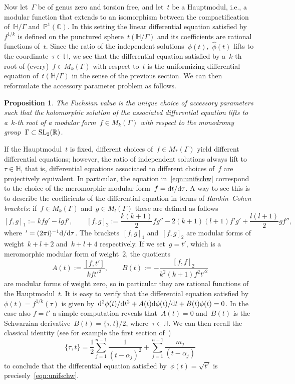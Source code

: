 \documentclass[pdftex]{sigma}
\newcommand{\C}{\mathbb{C}}
\newcommand{\R}{\mathbb{R}}
\newcommand{\pro}{\mathbb{P}}
\newcommand{\Po}{\mathbb{H}}
\numberwithin{equation}{section}
\newtheorem{Proposition}[Theorem]{Proposition}
 { \theoremstyle{definition}
\newtheorem{Definition}[Theorem]{Definition}
\newtheorem{Example}[Theorem]{Example}
\newtheorem{Remark}[Theorem]{Remark} }
\begin{document}
Now let~$\Gamma$ be of genus zero and torsion free, and let~$t$ be a Hauptmodul, i.e., a modular function that extends to an isomorphism between the compactification of~$\Po/\Gamma$ and~$\pro^1(\C)$. In this setting the linear differential equation satisfied by~$f^{1/k}$ is defined on the punctured sphere~$t(\Po/\Gamma)$ and its coefficients are rational functions of~$t$. Since the ratio of the independent solutions~$\phi(t)$,~$\hat{\phi}(t)$ lifts to the coordinate~$\tau\in\Po$, we see that the differential equation satisfied by a~$k$-th root of (every)~$f\in M_k(\Gamma)$ with respect to~$t$ is the uniformizing differential equation of~$t(\Po/\Gamma)$ in the sense of the previous section. We can then reformulate the accessory parameter problem as follows.
\begin{Proposition}\label{thm:refor}
The Fuchsian value is the unique choice of accessory parameters such that the holomorphic solution of the associated differential equation lifts to a~$k$-th root of a modular form~$f\in M_k(\Gamma)$ with respect to the monodromy group~$\Gamma\subset{\rm SL}_2(\R)$.
\end{Proposition}

If the Hauptmodul~$t$ is fixed, different choices of~$f\in M_*(\Gamma)$ yield different differential equations; however, the ratio of independent solutions always lift to~$\tau\in\Po$, that is, differential equations associated to different choices of~$f$ are projectively equivalent. In particular, the equation in~\eqref{eqn:unifschw} correspond to the choice of the meromorphic modular form~$f={\rm d}t/{\rm d}\tau$. A way to see this is to describe the coefficients of the differential equation in terms of \emph{Rankin--Cohen brackets}: if~$f\in M_k(\Gamma)$ and~$g\in M_l(\Gamma)$ these are defined as follows
\[
[f,g]_1:=kfg'-lgf' ,\qquad [f,g]_2:=\frac{k(k+1)}{2}fg''-2(k+1)(l+1)f'g'+\frac{l(l+1)}{2}gf'',
\]
where~$'=(2\pi {\rm i})^{-1}{\rm d}/{\rm d}\tau$. The brackets~$[f,g]_1$ and~$[f,g]_2$ are modular forms of weight~$k+l+2$ and~$k+l+4$ respectively. If we set~$g=t'$, which is a meromorphic modular form of weight~$2$, the quotients
\[
A(t) :=\frac{[f,t']}{kft'^2},\qquad B(t) :=-\frac{[f,f]_2}{k^2(k+1)f^2t'^2}
\]
are modular forms of weight zero, so in particular they are rational functions of the Hauptmodul~$t$. It is easy to verify that the differential equation satisfied by~$\phi(t)=f^{1/k}(\tau)$ is given by~${\rm d}^2\phi(t)/{\rm d}t^2+A(t){\rm d}\phi(t)/{\rm d}t+B(t)\phi(t)=0$.
In the case also $f=t'$ a simple computation reveals that~$A(t)=0$ and~$B(t)$ is the Schwarzian derivative~$B(t)=\{\tau,t\}/2$, where~$\tau\in\Po$. We can then recall the classical identity (see for example the first section of~\cite{TZ1})
\[
\{\tau,t\}=\frac{1}{2}\sum_{j=1}^{n-1}{\frac{1}{(t- \alpha_j)^2}}+\sum_{j=1}^{n-1}{\frac{m_j}{(t-\alpha_j)}}
\]
to conclude that the differential equation satisfied by~$\phi(t)=\sqrt{t'}$ is precisely~\eqref{eqn:unifschw}.
\end{document}
